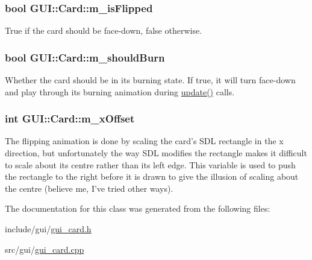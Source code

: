 \hypertarget{classGUI_1_1Card_ab7003a9c8f143d8c7043cf571220fb4f}{
\subsubsection[{m\-\_\-is\-Flipped}]{\setlength{\rightskip}{0pt plus 5cm}bool G\-U\-I\-::\-Card\-::m\-\_\-is\-Flipped\hspace{0.3cm}{\ttfamily [private]}}}\label{classGUI_1_1Card_ab7003a9c8f143d8c7043cf571220fb4f}


True if the card should be face-\/down, false otherwise. 

\hypertarget{classGUI_1_1Card_aed05e56f3810f9175504587a4eee601d}{
\subsubsection[{m\-\_\-should\-Burn}]{\setlength{\rightskip}{0pt plus 5cm}bool G\-U\-I\-::\-Card\-::m\-\_\-should\-Burn\hspace{0.3cm}{\ttfamily [private]}}}\label{classGUI_1_1Card_aed05e56f3810f9175504587a4eee601d}


Whether the card should be in its burning state. If true, it will turn face-\/down and play through its burning animation during \hyperlink{classGUI_1_1Card_a678aebdd57e220cbada5e15996743a10}{update()} calls. 

\hypertarget{classGUI_1_1Card_a2a1360126f9b6e21043347762d360aca}{
\subsubsection[{m\-\_\-x\-Offset}]{\setlength{\rightskip}{0pt plus 5cm}int G\-U\-I\-::\-Card\-::m\-\_\-x\-Offset\hspace{0.3cm}{\ttfamily [private]}}}\label{classGUI_1_1Card_a2a1360126f9b6e21043347762d360aca}


The flipping animation is done by scaling the card's S\-D\-L rectangle in the x direction, but unfortunately the way S\-D\-L modifies the rectangle makes it difficult to scale about its centre rather than its left edge. This variable is used to push the rectangle to the right before it is drawn to give the illusion of scaling about the centre (believe me, I've tried other ways). 



The documentation for this class was generated from the following files\-:\begin{DoxyCompactItemize}
\item 
include/gui/\hyperlink{gui__card_8h}{gui\-\_\-card.\-h}\item 
src/gui/\hyperlink{gui__card_8cpp}{gui\-\_\-card.\-cpp}\end{DoxyCompactItemize}
